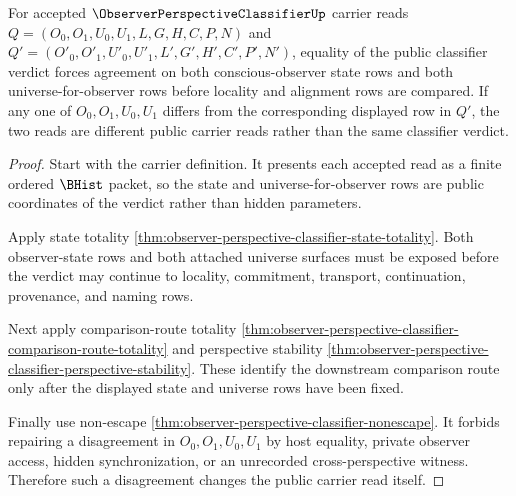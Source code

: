 \begin{theorem}
\label{thm:observer-perspective-classifier-two-state-no-confusion}
For accepted $\ObserverPerspectiveClassifierUp$ carrier reads $Q=(O_0,O_1,U_0,U_1,L,G,H,C,P,N)$ and $Q'=(O'_0,O'_1,U'_0,U'_1,L',G',H',C',P',N')$, equality of the public classifier verdict forces agreement on both conscious-observer state rows and both universe-for-observer rows before locality and alignment rows are compared. If any one of $O_0,O_1,U_0,U_1$ differs from the corresponding displayed row in $Q'$, the two reads are different public carrier reads rather than the same classifier verdict.
\end{theorem}
\begin{proof}
Start with the carrier definition. It presents each accepted read as a finite ordered $\BHist$ packet, so the state and universe-for-observer rows are public coordinates of the verdict rather than hidden parameters.

Apply state totality \autoref{thm:observer-perspective-classifier-state-totality}. Both observer-state rows and both attached universe surfaces must be exposed before the verdict may continue to locality, commitment, transport, continuation, provenance, and naming rows.

Next apply comparison-route totality \autoref{thm:observer-perspective-classifier-comparison-route-totality} and perspective stability \autoref{thm:observer-perspective-classifier-perspective-stability}. These identify the downstream comparison route only after the displayed state and universe rows have been fixed.

Finally use non-escape \autoref{thm:observer-perspective-classifier-nonescape}. It forbids repairing a disagreement in $O_0,O_1,U_0,U_1$ by host equality, private observer access, hidden synchronization, or an unrecorded cross-perspective witness. Therefore such a disagreement changes the public carrier read itself.
\end{proof}

